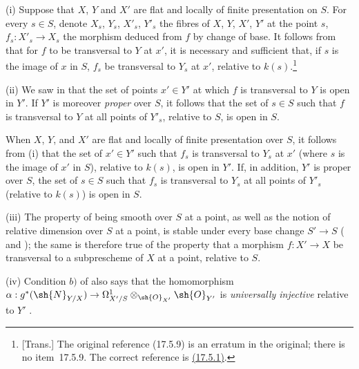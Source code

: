\begin{remarks}[17.13.4]
\label{IV.17.13.4}
(i)
Suppose that $X$, $Y$ and $X'$ are flat and locally of finite presentation on $S$.
For every $s\in S$, denote $X_s$, $Y_s$, $X'_s$, $Y'_s$ the fibres of $X$, $Y$, $X'$, $Y'$ at the point $s$, $f_s:X'_s\to X_s$ the morphism deduced from $f$ by change of base.
It follows from  that for $f$ to be transversal to $Y$ at $x'$, it is necessary and sufficient that, if $s$ is the image of $x$ in $S$, $f_s$ be transversal to $Y_s$ at $x'$, relative to $k(s)$.\footnote{[Trans.] The original reference (17.5.9) is an erratum in the original; there is no item~17.5.9. The correct reference is {\hyperlink{ega4.c04.thm.17-5-1}{(17.5.1)}}.}

(ii)
We saw in  that the set of points $x'\in Y'$ at which $f$ is transversal to $Y$ is open in $Y'$.
If $Y'$ is moreover \emph{proper} over $S$, it follows that the set of $s\in S$ such that $f$ is transversal to $Y$ at all points of $Y'_s$, relative to $S$, is open in $S$.

When $X$, $Y$, and $X'$ are flat and locally of finite presentation over $S$, it follows from (i) that the set of $x'\in Y'$ such that $f_s$ is transversal to $Y_s$ at $x'$ (where $s$ is the image of $x'$ in $S$), relative to $k(s)$, is open in $Y'$.
If, in addition, $Y'$ is proper over $S$, the set of $s\in S$ such that $f_s$ is transversal to $Y_s$ at all points of $Y'_s$ (relative to $k(s)$) is open in $S$.

(iii)
The property of being smooth over $S$ at a point, as well as the notion of relative dimension over $S$ at a point, is stable under every base change $S'\to S$ ( and ); the same is therefore true of the property that a morphism $f:X'\to X$ be transversal to a subprescheme of $X$ at a point, relative to $S$.

(iv)
Condition $b)$ of  also says that the homomorphism
$\alpha:g^*(\sh{N}_{Y/X})\to\Omega^1_{X'/S}\otimes_{\sh{O}_{X'}}\sh{O}_{Y'}$
is \emph{universally injective} relative to $Y'$ .
\end{remarks}

